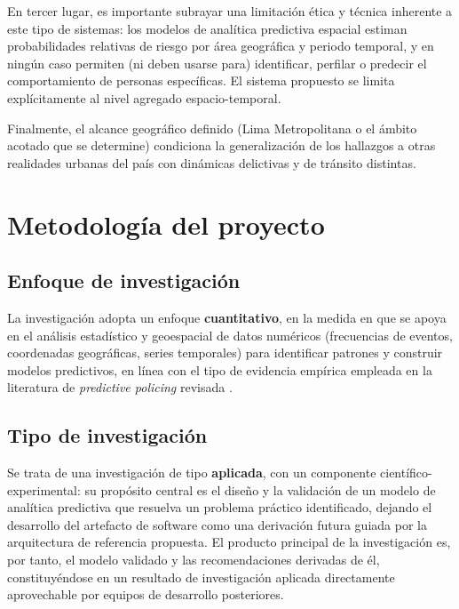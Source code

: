 \documentclass[12pt,letterpaper]{report}
\begin{document}
En tercer lugar, es importante subrayar una limitaci\'on \'etica y t\'ecnica inherente a este tipo de sistemas: los modelos de analítica predictiva espacial estiman probabilidades relativas de riesgo por \'area geogr\'afica y periodo temporal, y en ning\'un caso permiten (ni deben usarse para) identificar, perfilar o predecir el comportamiento de personas espec\'ificas. El sistema propuesto se limita expl\'icitamente al nivel agregado espacio-temporal.

Finalmente, el alcance geogr\'afico definido (Lima Metropolitana o el \'ambito acotado que se determine) condiciona la generalizaci\'on de los hallazgos a otras realidades urbanas del pa\'is con din\'amicas delictivas y de tr\'ansito distintas.

\section{Metodolog\'ia del proyecto}

\subsection{Enfoque de investigaci\'on}
La investigaci\'on adopta un enfoque \textbf{cuantitativo}, en la medida en que se apoya en el an\'alisis estad\'istico y geoespacial de datos num\'ericos (frecuencias de eventos, coordenadas geogr\'aficas, series temporales) para identificar patrones y construir modelos predictivos, en l\'inea con el tipo de evidencia emp\'irica empleada en la literatura de \textit{predictive policing} revisada \citep{chainey2008kde,mohler2011selfexciting}.

\subsection{Tipo de investigaci\'on}
Se trata de una investigaci\'on de tipo \textbf{aplicada}, con un componente cient\'ifico-experimental: su prop\'osito central es el dise\~no y la validaci\'on de un modelo de analítica predictiva que resuelva un problema pr\'actico identificado, dejando el desarrollo del artefacto de software como una derivaci\'on futura guiada por la arquitectura de referencia propuesta. El producto principal de la investigaci\'on es, por tanto, el modelo validado y las recomendaciones derivadas de \'el, constituy\'endose en un resultado de investigaci\'on aplicada directamente aprovechable por equipos de desarrollo posteriores.
\end{document}
